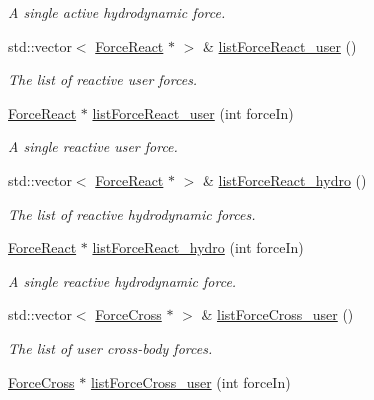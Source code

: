 \begin{DoxyCompactItemize}
\begin{DoxyCompactList}\small\item\em A single active hydrodynamic force. \end{DoxyCompactList}\item 
std\-::vector$<$ \hyperlink{classosea_1_1ofreq_1_1_force_react}{Force\-React} $\ast$ $>$ \& \hyperlink{classosea_1_1ofreq_1_1_body_afc1e6e0018dd26cc3702b74aea12ed9b}{list\-Force\-React\-\_\-user} ()
\begin{DoxyCompactList}\small\item\em The list of reactive user forces. \end{DoxyCompactList}\item 
\hyperlink{classosea_1_1ofreq_1_1_force_react}{Force\-React} $\ast$ \hyperlink{classosea_1_1ofreq_1_1_body_a8afe32e16a7869395083de6cb0aca63e}{list\-Force\-React\-\_\-user} (int force\-In)
\begin{DoxyCompactList}\small\item\em A single reactive user force. \end{DoxyCompactList}\item 
std\-::vector$<$ \hyperlink{classosea_1_1ofreq_1_1_force_react}{Force\-React} $\ast$ $>$ \& \hyperlink{classosea_1_1ofreq_1_1_body_ad68893d21ecf337242d68936132ad25a}{list\-Force\-React\-\_\-hydro} ()
\begin{DoxyCompactList}\small\item\em The list of reactive hydrodynamic forces. \end{DoxyCompactList}\item 
\hyperlink{classosea_1_1ofreq_1_1_force_react}{Force\-React} $\ast$ \hyperlink{classosea_1_1ofreq_1_1_body_a774fe4681465ee5a8ea344f4ec7c18e2}{list\-Force\-React\-\_\-hydro} (int force\-In)
\begin{DoxyCompactList}\small\item\em A single reactive hydrodynamic force. \end{DoxyCompactList}\item 
std\-::vector$<$ \hyperlink{classosea_1_1ofreq_1_1_force_cross}{Force\-Cross} $\ast$ $>$ \& \hyperlink{classosea_1_1ofreq_1_1_body_ac428c19730346a51bde800e0cbc2e281}{list\-Force\-Cross\-\_\-user} ()
\begin{DoxyCompactList}\small\item\em The list of user cross-\/body forces. \end{DoxyCompactList}\item 
\hyperlink{classosea_1_1ofreq_1_1_force_cross}{Force\-Cross} $\ast$ \hyperlink{classosea_1_1ofreq_1_1_body_af01cd5dc37ebd7969f4f2bc10ba3d76b}{list\-Force\-Cross\-\_\-user} (int force\-In)

\end{DoxyCompactItemize}
